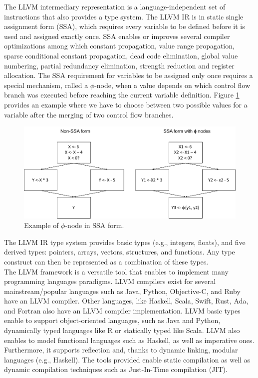 The LLVM intermediary representation is a language-independent set of instructions that also provides a type system.
The LLVM IR is in static single assignment form (SSA), which requires every variable to be defined before it is used and assigned exactly once. 
SSA enables or improves several compiler optimizations among which constant propagation, value range propagation, sparse conditional constant propagation, dead code elimination, global value numbering, partial redundancy elimination, strength reduction and register allocation.
The SSA requirement for variables to be assigned only once requires a special mechanism, called a $\phi$-node, when a value depends on which control flow branch was executed before reaching the current variable definition.
Figure \ref{SSA example} provides an example where we have to choose between two possible values for a variable after the merging of two control flow branches.

\begin{figure}[h]
\centering
\includegraphics[scale=0.5]{Figures/SSAForm}
\decoRule
\caption[SSA example]{Example of $\phi$-node in SSA form.}
\label{SSA example}
\end{figure}

The LLVM IR type system provides basic types (e.g., integers, floats), and five derived types: pointers, arrays, vectors, structures, and functions.
Any type construct can then be represented as a combination of these types.\\

The LLVM framework is a versatile tool that enables to implement many programming languages paradigms.
LLVM compilers exist for several mainstream/popular languages such as Java, Python, Objective-C, and Ruby have an LLVM compiler.
Other languages, like Haskell, Scala, Swift, Rust, Ada, and Fortran also have an LLVM compiler implementation.
LLVM basic types enable to support object-oriented languages, such as Java and Python, dynamically typed languages like R or statically typed like Scala.
LLVM also enables to model functional languages such as Haskell, as well as imperative ones. 
Furthermore, it supports reflection and, thanks to dynamic linking, modular languages (e.g., Haskell).
The tools provided enable static compilation as well as dynamic compilation techniques such as Just-In-Time compilation (JIT).\\

